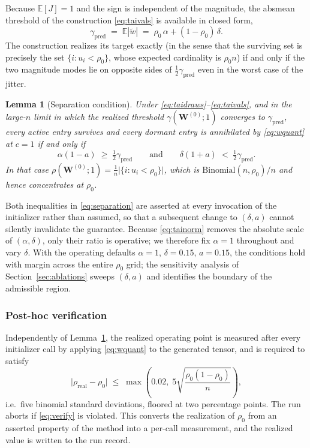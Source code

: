 \documentclass[final,5p,times,twocolumn]{elsarticle}
\newtheorem{lemma}{Lemma}
\theoremstyle{remark}
\newcommand{\E}{\mathbb{E}}
\newcommand{\Wm}{\mathbf{W}}
\newcommand{\rhoz}{\rho_{0}}
\begin{document}
Because $\E[J] = 1$ and the sign is independent of the magnitude, the absmean
threshold of the construction \eqref{eq:taivals} is available in closed form,
\begin{equation}
\label{eq:gammapred}
\gamma_{\mathrm{pred}} \;=\; \E|\tilde{w}| \;=\;
\rhoz\,\alpha + (1-\rhoz)\,\delta.
\end{equation}
The construction realizes its target exactly (in the sense that the surviving
set is precisely the set $\{i: u_i < \rhoz\}$, whose expected cardinality is
$\rhoz n$) if and only if the two magnitude modes lie on opposite sides of
$\tfrac{1}{2}\gamma_{\mathrm{pred}}$ even in the worst case of the jitter.

\begin{lemma}[Separation condition]
\label{lem:separation}
Under \eqref{eq:taidraws}--\eqref{eq:taivals}, and in the large-$n$ limit in
which the realized threshold $\gamma(\Wm^{(0)};1)$ converges to
$\gamma_{\mathrm{pred}}$, every active entry survives and every dormant entry
is annihilated by \eqref{eq:wquant} at $c = 1$ if and only if
\begin{equation}
\label{eq:separation}
\alpha(1-a) \;\geq\; \tfrac{1}{2}\gamma_{\mathrm{pred}}
\qquad\text{and}\qquad
\delta(1+a) \;<\; \tfrac{1}{2}\gamma_{\mathrm{pred}}.
\end{equation}
In that case $\rho(\Wm^{(0)};1) = \frac{1}{n}\big|\{i: u_i < \rhoz\}\big|$,
which is $\mathrm{Binomial}(n,\rhoz)/n$ and hence concentrates at $\rhoz$.
\end{lemma}

Both inequalities in \eqref{eq:separation} are asserted at every invocation of
the initializer rather than assumed, so that a subsequent change to
$(\delta, a)$ cannot silently invalidate the guarantee. Because
\eqref{eq:tainorm} removes the absolute scale of $(\alpha, \delta)$, only
their ratio is operative; we therefore fix $\alpha = 1$ throughout and vary
$\delta$. With the operating defaults $\alpha = 1$, $\delta = 0.15$,
$a = 0.15$, the conditions hold with margin across the entire $\rhoz$ grid; the sensitivity analysis of
Section~\ref{sec:ablations} sweeps $(\delta, a)$ and identifies the boundary of
the admissible region.

\subsubsection{Post-hoc verification}

Independently of Lemma~\ref{lem:separation}, the realized operating point
is measured after every initializer call by applying \eqref{eq:wquant} to the
generated tensor, and is required to satisfy
\begin{equation}
\label{eq:verify}
\big|\rho_{\mathrm{real}} - \rhoz\big| \;\leq\;
\max\!\left(0.02,\; 5\sqrt{\frac{\rhoz(1-\rhoz)}{n}}\right),
\end{equation}
i.e.\ five binomial standard deviations, floored at two percentage points. The
run aborts if \eqref{eq:verify} is violated. This converts the realization of
$\rhoz$ from an asserted property of the method into a per-call measurement,
and the realized value is written to the run record.
\end{document}
